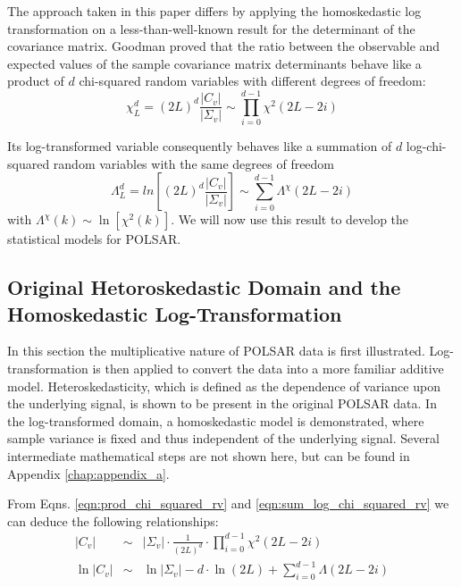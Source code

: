 \documentclass[journal]{IEEEtran}
\begin{document}
The approach taken in this paper differs by applying the homoskedastic log transformation  on a less-than-well-known result for the determinant of the covariance matrix.
Goodman \cite{Goodman_1963_AMS_178} proved
that the ratio between the observable and expected values of the sample covariance matrix determinants
  behave like a product of $d$ chi-squared random variables with different degrees of freedom: 
\begin{equation}
\chi^d_L = (2L)^d \frac{|C_v|}{|\Sigma_v|} \sim \prod_{i=0}^{d-1} \chi^2 (2L-2i)
\label{eqn:prod_chi_squared_rv}  
\end{equation}

Its log-transformed variable consequently 
  behaves like a summation of $d$ log-chi-squared random variables with the same degrees of freedom  
\begin{equation}
\Lambda^d_L = ln \left[ (2L)^d \frac{|C_v|}{|\Sigma_v|} \right] \sim \sum_{i=0}^{d-1} \Lambda^\chi (2L-2i)
\label{eqn:sum_log_chi_squared_rv}
\end{equation}
with
  $\Lambda^\chi (k) \sim \ln \left[ \chi^2 (k) \right]$.
We will now use this result to develop the statistical models for POLSAR. %



\subsection{Original Hetoroskedastic Domain and the Homoskedastic Log-Transformation}
\label{sec:polsar_heterosked_model_and_log_transform}

In this section the multiplicative nature of POLSAR data is first illustrated.
 Log-transformation is then applied to convert  the data into a more familiar additive model.
Heteroskedasticity, which is defined as the dependence of variance upon the underlying signal,
  is shown to be present in the original POLSAR data.
In the log-transformed domain, a homoskedastic model is demonstrated,
  where sample variance is fixed and thus independent of the underlying signal.
Several intermediate mathematical steps are not shown here, but can be found in Appendix \ref{chap:appendix_a}.
  
From Eqns. \ref{eqn:prod_chi_squared_rv} and \ref{eqn:sum_log_chi_squared_rv}
we can deduce the following relationships:
\begin{eqnarray}
  |C_v| &\sim& |\Sigma_v| \cdot \frac{1}{(2L)^d} \cdot \prod_{i=0}^{d-1} \chi^2 (2L-2i) \label{eqn:determinant_distribution} \\
  \ln|C_v| &\sim& \ln|\Sigma_v| - d \cdot \ln(2L) + \sum^{d-1}_{i=0} \Lambda(2L-2i)
\label{eqn:log_determinant_distribution}  
\end{eqnarray}
\end{document}
